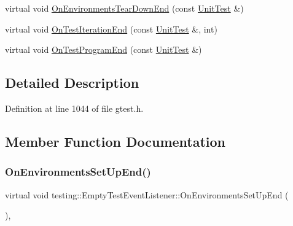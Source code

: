 \begin{DoxyCompactItemize}
virtual void \hyperlink{classtesting_1_1EmptyTestEventListener_aea64c83c415b33a4c0b0239bafd1438d}{On\+Environments\+Tear\+Down\+End} (const \hyperlink{classtesting_1_1UnitTest}{Unit\+Test} \&)
\item 
virtual void \hyperlink{classtesting_1_1EmptyTestEventListener_a2253e5a18b3cf7bccd349567a252209d}{On\+Test\+Iteration\+End} (const \hyperlink{classtesting_1_1UnitTest}{Unit\+Test} \&, int)
\item 
virtual void \hyperlink{classtesting_1_1EmptyTestEventListener_a0abcc02bd2331a2e29ad6f4d9daf2a32}{On\+Test\+Program\+End} (const \hyperlink{classtesting_1_1UnitTest}{Unit\+Test} \&)
\end{DoxyCompactItemize}


\subsection{Detailed Description}


Definition at line 1044 of file gtest.\+h.



\subsection{Member Function Documentation}
\mbox{\label{classtesting_1_1EmptyTestEventListener_abc481c6648d15d4242245195a06f5aa0}} 
\subsubsection{\texorpdfstring{On\+Environments\+Set\+Up\+End()}{OnEnvironmentsSetUpEnd()}}
{\footnotesize\ttfamily virtual void testing\+::\+Empty\+Test\+Event\+Listener\+::\+On\+Environments\+Set\+Up\+End (\begin{DoxyParamCaption}\item[{const \hyperlink{classtesting_1_1UnitTest}{Unit\+Test} \&}]{ }\end{DoxyParamCaption})\hspace{0.3cm}{\ttfamily [inline]}, {\ttfamily [virtual]}}



